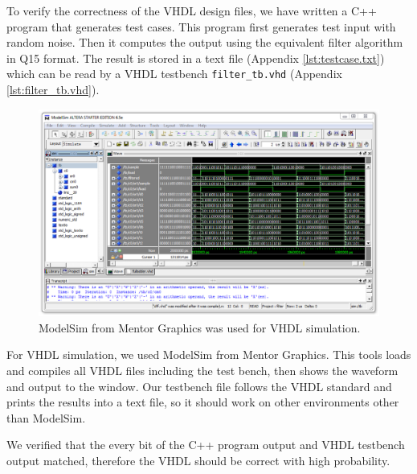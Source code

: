To verify the correctness of the VHDL design files, we have written a C++ program that generates test cases. This program first generates test input with random noise. Then it computes the output using the equivalent filter algorithm in Q15 format. The result is stored in a text file (Appendix \ref{lst:testcase.txt}) which can be read by a VHDL testbench \texttt{filter\_tb.vhd} (Appendix \ref{lst:filter_tb.vhd}).

\begin{figure}[htbp]
	\centering
	\includegraphics[width=6.5in]{images/modelsim}
	\caption{ModelSim from Mentor Graphics was used for VHDL simulation.}
	\label{fig:q7}
\end{figure}

For VHDL simulation, we used ModelSim from Mentor Graphics. This tools loads and compiles all VHDL files including the test bench, then shows the waveform and output to the window. Our testbench file follows the VHDL standard and prints the results into a text file, so it should work on other environments other than ModelSim.

We verified that the every bit of the C++ program output and VHDL testbench output matched, therefore the VHDL should be correct with high probability.